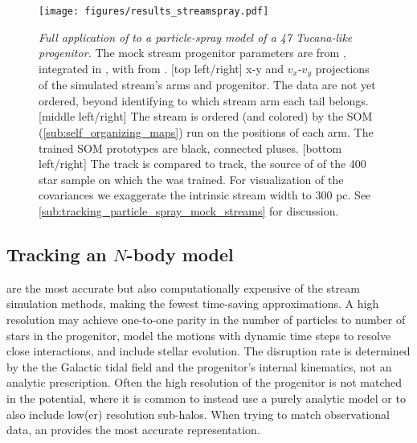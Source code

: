 \documentclass[fleqn,usenatbib]{mnras}
\begin{document}
    \begin{figure*}
      \centering
      \texttt{[image: figures/results\_streamspray.pdf]}
      \caption{
        \emph{Full application of} \trackstream{} \emph{to a particle-spray
        model of a 47 Tucana-like progenitor.} The mock stream progenitor
        parameters are from \citet{Vasiliev2019}, integrated in
        \galpyMWPotential{}, with \galpystreamspraydf{} from \citet{Bovy2014}.
        [top left/right] x-y and $v_x$-$v_y$ projections of the simulated
        stream's arms and progenitor. The data are not yet ordered, beyond
        identifying to which stream arm each tail belongs.
        [middle left/right] The stream is ordered (and colored) by the SOM
        (\autoref{sub:self_organizing_maps}) run on the positions of each arm.
        The trained SOM prototypes are black, connected pluses.
        [bottom left/right] The \trackstream{} track is compared to
        \galpystreamspraydf{} track, the source of of the 400 star sample on
        which the \trackstream{} was trained. For visualization of the
        covariances we exaggerate the intrinsic stream width to 300 pc. See
        \autoref{sub:tracking_particle_spray_mock_streams} for discussion. }
      \label{fig:results_streamspray}
    \end{figure*}


  \subsection[Tracking an N-body model]{Tracking an $N$-body model}
  \label{sub:tracking_an_n_body_model}

    \nbodys{} are the most accurate but also computationally expensive of the
    stream simulation methods, making the fewest time-saving approximations. A
    high resolution \nbody{} may achieve one-to-one parity in the
    number of particles to number of stars in the progenitor, model the motions
    with dynamic time steps to resolve close interactions, and include stellar
    evolution. The disruption rate is determined by the the Galactic tidal field
    and the progenitor's internal kinematics, not an analytic prescription.
    Often the high resolution of the progenitor is not matched in the potential,
    where it is common to instead use a purely analytic model or to also include
    low(er) resolution sub-halos. When trying to match observational data, an
    \nbody{} provides the most accurate representation.
\end{document}

